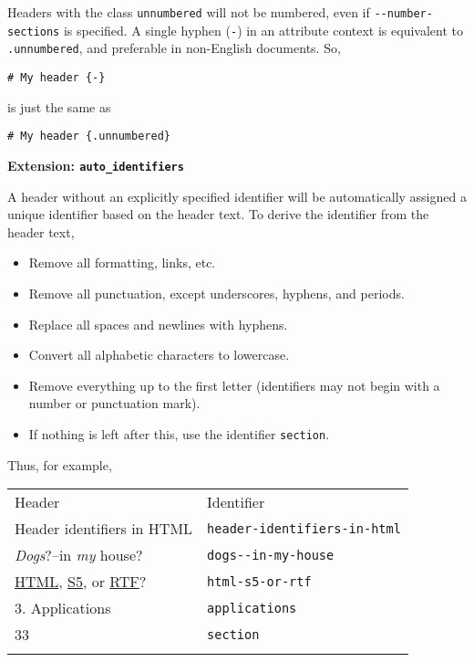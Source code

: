 \documentclass[]{article}
\begin{document}
Headers with the class \texttt{unnumbered} will not be numbered, even if
\texttt{-{}-number-sections} is specified. A single hyphen (\texttt{-})
in an attribute context is equivalent to \texttt{.unnumbered}, and
preferable in non-English documents. So,

\begin{verbatim}
# My header {-}
\end{verbatim}

is just the same as

\begin{verbatim}
# My header {.unnumbered}
\end{verbatim}

\textbf{Extension: \texttt{auto\_identifiers}}

A header without an explicitly specified identifier will be
automatically assigned a unique identifier based on the header text. To
derive the identifier from the header text,

\begin{itemize}
\itemsep1pt\parskip0pt
\item
  Remove all formatting, links, etc.
\item
  Remove all punctuation, except underscores, hyphens, and periods.
\item
  Replace all spaces and newlines with hyphens.
\item
  Convert all alphabetic characters to lowercase.
\item
  Remove everything up to the first letter (identifiers may not begin
  with a number or punctuation mark).
\item
  If nothing is left after this, use the identifier \texttt{section}.
\end{itemize}

Thus, for example,

\begin{longtable}[c]{@{}ll@{}}
\hline\noalign{\medskip}
Header & Identifier
\\\noalign{\medskip}
\hline\noalign{\medskip}
Header identifiers in HTML & \texttt{header-identifiers-in-html}
\\\noalign{\medskip}
\emph{Dogs}?--in \emph{my} house? & \texttt{dogs-{}-in-my-house}
\\\noalign{\medskip}
\href{http://www.w3.org/TR/html40/}{HTML},
\href{http://meyerweb.com/eric/tools/s5/}{S5}, or
\href{http://en.wikipedia.org/wiki/Rich_Text_Format}{RTF}? &
\texttt{html-s5-or-rtf}
\\\noalign{\medskip}
3. Applications & \texttt{applications}
\\\noalign{\medskip}
33 & \texttt{section}
\\\noalign{\medskip}
\hline
\end{longtable}
\end{document}
